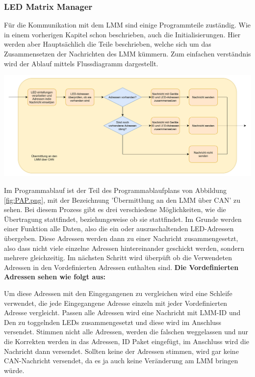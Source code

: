 \documentclass[paper=a4, 12pt]{scrreprt}
\begin{document}
			\subsubsection{LED Matrix Manager}
			Für die Kommunikation mit dem LMM sind einige Programmteile zuständig. Wie in einem vorherigen Kapitel schon beschrieben, auch die Initialisierungen. Hier werden aber Hauptsächlich die Teile beschrieben, welche sich um das Zusammensetzen der Nachrichten des LMM kümmern. Zum einfachen verständnis wird der Ablauf mittels Flussdiagramm dargestellt.
			\begin{adjustbox}{center,caption={Programmablauf LMM},label={fig:PABL-LMM},nofloat=figure,vspace=\bigskipamount}
				\includegraphics[width=\textwidth]{img/Programmablauf-LMM.png}
			\end{adjustbox}
			Im Programmablauf ist der Teil des Programmablaufplans von Abbildung \ref{fig:PAP.png}, mit der Bezeichnung 'Übermittlung an den LMM über CAN' zu sehen. Bei diesem Prozess gibt es drei verschiedene Möglichkeiten, wie die Übertragung stattfindet, beziehungsweise ob sie stattfindet. Im Grunde werden einer Funktion alle Daten, also die ein oder auszuschaltenden LED-Adressen übergeben. Diese Adressen werden dann zu einer Nachricht zusammengesetzt, also dass nicht viele einzelne Adressen hintereinander geschickt werden, sondern mehrere gleichzeitig. Im nächsten Schritt wird überpüft ob die Verwendeten Adressen in den Vordefinierten Adressen enthalten sind. \hfill \break \newpage
			\textbf{Die Vordefinierten Adressen sehen wie folgt aus:}
			
			Um diese Adressen mit den Eingegangenen zu vergleichen wird eine Schleife verwendet, die jede Eingegangene Adresse einzeln mit jeder Vordefinierten Adresse vergleicht. Passen alle Adressen wird eine Nachricht mit LMM-ID und Den zu toggelnden LEDs zusammengesetzt und diese wird im Anschluss versendet. \hfill \break
			Stimmen nicht alle Adressen, werden die falschen weggelassen und nur die Korrekten werden in das Adressen, ID Paket eingefügt, im Anschluss wird die Nachricht dann versendet. \hfill \break
			Sollten keine der Adressen stimmen, wird gar keine CAN-Nachricht versendet, da es ja auch keine Veränderung am LMM bringen würde.
			\newpage
			
\end{document}
